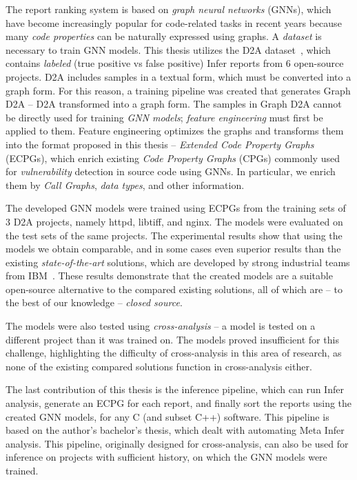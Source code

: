The report ranking system is based on \textit{graph neural networks} (GNNs), which have become increasingly popular for code-related tasks in recent years because many \textit{code properties} can be naturally expressed using graphs. A \textit{dataset} is necessary to train GNN models. This thesis utilizes the D2A dataset~\cite{D2A-zheng2021d2a}, which contains \textit{labeled} (true positive vs false positive) Infer reports from 6 open-source projects. D2A includes samples in a textual form, which must be converted into a graph form. For this reason, a training pipeline was created that generates Graph D2A -- D2A transformed into a graph form. The samples in Graph D2A cannot be directly used for training \textit{GNN models}; \textit{feature engineering} must first be applied to them. Feature engineering optimizes the graphs and transforms them into the format proposed in this thesis -- \textit{Extended Code Property Graphs} (ECPGs), which enrich existing \textit{Code Property Graphs} (CPGs) commonly used for \textit{vulnerability} detection in source code using GNNs.
In particular, we enrich them by \textit{Call Graphs}, \textit{data types}, and other information.

The developed GNN models were trained using ECPGs from the training sets of 3 D2A projects, namely httpd, libtiff, and nginx. The models were evaluated on the test sets of the same projects. The experimental results show that using the models we obtain comparable, and in some cases even superior results than the existing \textit{state-of-the-art} solutions, which are developed by strong industrial teams from IBM~\cite{D2A-zheng2021d2a, pujar2024analyzing}. These results demonstrate that the created models are a suitable open-source alternative to the compared existing solutions, all of which are -- to the best of our knowledge -- \textit{closed source}.

The models were also tested using \textit{cross-analysis} -- a model is tested on a different project than it was trained on. The models proved insufficient for this challenge, highlighting the difficulty of cross-analysis in this area of research, as none of the existing compared solutions function in cross-analysis either.

The last contribution of this thesis is the inference pipeline, which can run Infer analysis, generate an ECPG for each report, and finally sort the reports using the created GNN models, for any C (and subset C++) software. This pipeline is based on the author's bachelor's thesis, which dealt with automating Meta Infer analysis. This pipeline, originally designed for cross-analysis, can also be used for inference on projects with sufficient history, on which the GNN models were trained.


